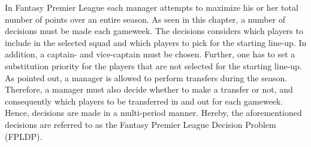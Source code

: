 In Fantasy Premier League each manager attempts to maximize his or her total number of points over an entire season. As seen in this chapter, a number of decisions must be made each gameweek. The decisions considers which players to include in the selected squad and which players to pick for the starting line-up. In addition, a captain- and vice-captain must be chosen. Further, one has to set a substitution priority for the players that are not selected for the starting line-up. As pointed out, a manager is allowed to perform transfers during the season. Therefore, a manager must also decide whether to make a transfer or not, and consequently which players to be transferred in and out for each gameweek. Hence, decisions are made in a multi-period manner. Hereby, the aforementioned decisions are referred to as the Fantasy Premier League Decision Problem (FPLDP).